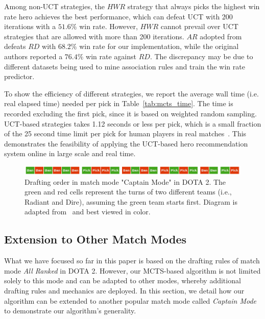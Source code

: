 Among non-UCT strategies, the $HWR$ strategy that always picks the highest win rate hero achieves the best performance, which can defeat UCT with 200 iterations with a $51.6\%$ win rate. However, $HWR$ cannot prevail over UCT strategies that are allowed with more than 200 iterations. $AR$ adopted from~\cite{hanke2017reco} defeats $RD$ with $68.2\%$ win rate for our implementation, while the original authors reported a $76.4\%$ win rate against $RD$. The discrepancy may be due to different datasets being used to mine association rules and train the win rate predictor.

To show the efficiency of different strategies, we report the average wall time (i.e. real elapsed time) needed per pick in Table~\ref{tab:mcts_time}. The time is recorded excluding the first pick, since it is based on weighted random sampling. UCT-based strategies takes 1.12 seconds or less per pick, which is a small fraction of the 25 second time limit per pick for human players in real matches~\cite{dotapickorder}. This demonstrates the feasibility of applying the UCT-based hero recommendation system online in large scale and real time.



\begin{figure}
\centering
\includegraphics[width=1\textwidth]{Figures/pickorder_captain_mode.png}
\caption{Drafting order in match mode "Captain Mode" in DOTA 2. The green and red cells represent the turns of two different teams (i.e., Radiant and Dire), assuming the green team starts first. Diagram is adapted from~\cite{dotapickorder} and best viewed in color.}
\label{fig:pickorder_captain_mode}
\end{figure}

\subsection{Extension to Other Match Modes}\label{sec:extension}
What we have focused so far in this paper is based on the drafting rules of match mode \textit{All Ranked} in DOTA 2. However, our MCTS-based algorithm is not limited solely to this mode and can be adapted to other modes, whereby additional drafting rules and mechanics are deployed. In this section, we detail how our algorithm can be extended to another popular match mode called \textit{Captain Mode} to demonstrate our algorithm's generality. 

